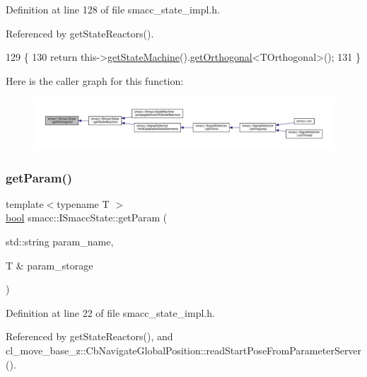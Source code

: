 Definition at line 128 of file smacc\+\_\+state\+\_\+impl.\+h.



Referenced by get\+State\+Reactors().


\begin{DoxyCode}
129 \{
130     \textcolor{keywordflow}{return} this->\hyperlink{classsmacc_1_1ISmaccState_a562bb3f9a3ac16b8be71e4794c9e7523}{getStateMachine}().\hyperlink{classsmacc_1_1ISmaccStateMachine_a38b8b6e3d65b7de33020c9c397cf29bb}{getOrthogonal}<TOrthogonal>();
131 \}
\end{DoxyCode}
Here is the caller graph for this function\+:
\nopagebreak
\begin{figure}[H]
\begin{center}
\leavevmode
\includegraphics[width=350pt]{classsmacc_1_1ISmaccState_afc5c5683cbe39964a52fc3a2553196d2_icgraph}
\end{center}
\end{figure}
\mbox{\label{classsmacc_1_1ISmaccState_abbb3a24b912c6e8de28f7b86123b6357}} 
\subsubsection{\texorpdfstring{get\+Param()}{getParam()}}
{\footnotesize\ttfamily template$<$typename T $>$ \\
\hyperlink{classbool}{bool} smacc\+::\+I\+Smacc\+State\+::get\+Param (\begin{DoxyParamCaption}\item[{std\+::string}]{param\+\_\+name,  }\item[{T \&}]{param\+\_\+storage }\end{DoxyParamCaption})}



Definition at line 22 of file smacc\+\_\+state\+\_\+impl.\+h.



Referenced by get\+State\+Reactors(), and cl\+\_\+move\+\_\+base\+\_\+z\+::\+Cb\+Navigate\+Global\+Position\+::read\+Start\+Pose\+From\+Parameter\+Server().


